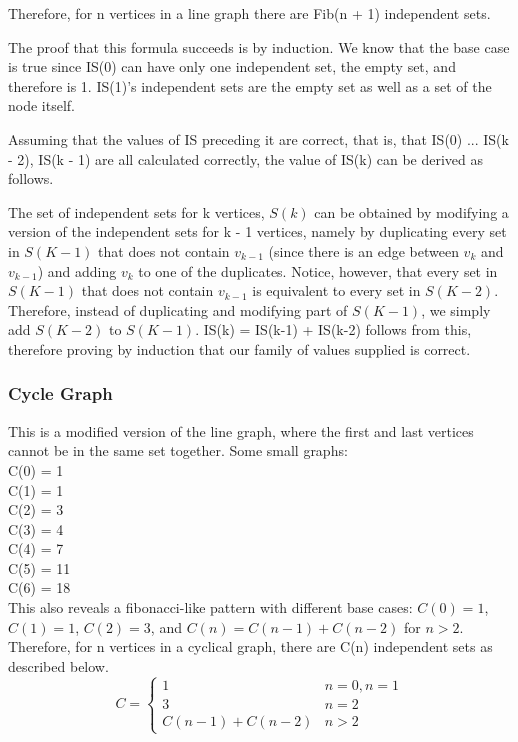 \documentclass[11pt]{article}
\begin{document}
Therefore, for n vertices in a line graph there are Fib(n + 1) independent sets.

The proof that this formula succeeds is by induction. We know that the base case is true since IS(0) can have only one independent set, the empty set, and therefore is 1. IS(1)'s independent sets are the empty set as well as a set of the node itself. 

Assuming that the values of IS preceding it are correct, that is, that IS(0) ... IS(k - 2), IS(k - 1) are all calculated correctly, the value of IS(k) can be derived as follows. 

The set of independent sets for k vertices, $S(k)$ can be obtained by modifying a version of the independent sets for k - 1 vertices, namely by duplicating every set in $S(K - 1)$ that does not contain $v_{k-1}$ (since there is an edge between $v_k$ and $v_{k-1}$) and adding $v_k$ to one of the duplicates. Notice, however, that every set in $S(K-1)$ that does not contain $v_{k-1}$ is equivalent to every set in $S(K - 2)$. Therefore, instead of duplicating and modifying part of $S(K - 1)$, we simply add $S(K - 2)$ to $S(K - 1)$. IS(k) = IS(k-1) + IS(k-2) follows from this, therefore proving by induction that our family of values supplied is correct.

\subsubsection{Cycle Graph}
This is a modified version of the line graph, where the first and last vertices cannot be in the same set together. 
Some small graphs: \\
C(0) = 1\\
C(1) = 1\\
C(2) = 3\\
C(3) = 4\\
C(4) = 7\\
C(5) = 11\\
C(6) = 18\\
This also reveals a fibonacci-like pattern with different base cases: $C(0) = 1$, $C(1) = 1$, $C(2) = 3$, and $C(n) = C(n-1) + C(n-2)$ for $n > 2$. Therefore, for n vertices in a cyclical graph, there are C(n) independent sets as described below.
$$ C  = 
\begin{cases}
	1 & n = 0, n = 1\\
	3 & n = 2\\
	C(n - 1) + C(n - 2) & n > 2 
\end{cases} 
$$
\end{document}
